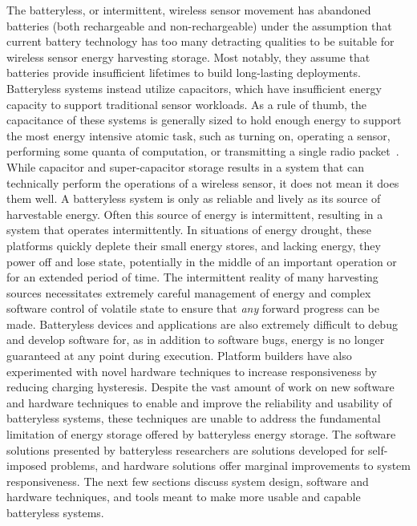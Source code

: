 The batteryless, or intermittent, wireless sensor movement has abandoned batteries (both rechargeable and non-rechargeable) under the assumption that current battery technology has too many detracting qualities to be suitable for wireless sensor energy harvesting storage.
Most notably, they assume that batteries provide insufficient lifetimes to build long-lasting deployments.
Batteryless systems instead utilize capacitors, which have insufficient energy capacity to support traditional sensor workloads.
As a rule of thumb, the capacitance of these systems is generally sized to hold enough energy to support the most energy intensive atomic task, such as turning on, operating a sensor, performing some quanta of computation, or transmitting a single radio packet~\cite{nardello2019camaroptera,colinReconfigurable18, shukla2019skinnypower, hesterFlicker17}.
While capacitor and super-capacitor storage results in a system that can technically perform the operations of a wireless sensor, it does not mean it does them well.
A batteryless system is only as reliable and lively as its source of harvestable energy.
Often this source of energy is intermittent, resulting in a system that operates intermittently.
In situations of energy drought, these platforms quickly deplete their
small energy stores, and lacking energy,
they power off and lose
state, potentially in the middle of an important operation or for an extended period of time.
The intermittent reality of many harvesting sources necessitates extremely careful management of energy and complex software control of volatile state to ensure that \textit{any} forward progress can be made.
Batteryless devices and applications are also extremely difficult to debug and develop software for, as in addition to software bugs, energy is no longer guaranteed at any point during execution.
Platform builders have also experimented with novel hardware techniques to increase responsiveness by reducing charging hysteresis.
Despite the vast amount of work on new software and hardware techniques to enable and improve the reliability and usability of batteryless systems, these techniques are unable to address the fundamental limitation of energy storage offered by batteryless energy storage.
The software solutions presented by batteryless researchers are solutions developed for self-imposed problems, and hardware solutions offer marginal improvements to system responsiveness.
The next few sections discuss system design, software and hardware techniques, and tools meant to make more usable and capable batteryless systems.
